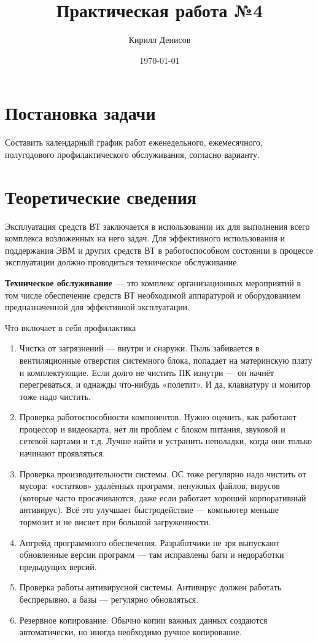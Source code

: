 \documentclass[a4paper,14pt]{extarticle}
\author{Кирилл Денисов}
\title{Практическая работа №4}
\date{\today}
\newcommand{\pathToCommonFolder}{/home/denilai/Documents/repos/latex/Common}
\begin{document}
	\thispagestyle{empty}
	
	\newpage
	\newpage
	
	
	
	
\section*{Постановка задачи}

Составить календарный график работ еженедельного, ежемесячного, полугодового профилактического обслуживания, согласно варианту.

\section*{Теоретические сведения} 

Эксплуатация средств ВТ заключается в использовании их для выполнения всего комплекса возложенных на него задач. Для эффективного использования и поддержания ЭВМ и других средств ВТ в работоспособном состоянии в процессе эксплуатации должно проводиться техническое обслуживание.

\textbf{Техническое обслуживание} --- это комплекс организационных мероприятий в том числе обеспечение средств ВТ необходимой аппаратурой и оборудованием предназначенной для эффективной эксплуатации.

Что включает в себя профилактика
\begin{enumerate}
\item Чистка от загрязнений --- внутри и снаружи. Пыль забивается в вентиляционные отверстия системного блока, попадает на материнскую плату и комплектующие. Если долго не чистить ПК изнутри --- он начнёт перегреваться, и однажды что-нибудь «полетит». И да, клавиатуру и монитор тоже надо чистить.

\item  Проверка работоспособности компонентов. Нужно оценить, как работают процессор и видеокарта, нет ли проблем с блоком питания, звуковой и сетевой картами и т.д. Лучше найти и устранить неполадки, когда они только начинают проявляться.

\item  Проверка производительности системы. ОС тоже регулярно надо чистить от мусора: «остатков» удалённых программ, ненужных файлов, вирусов (которые часто просачиваются, даже если работает хороший корпоративный антивирус). Всё это улучшает быстродействие --- компьютер меньше тормозит и не виснет при большой загруженности.

\item  Апгрейд программного обеспечения. Разработчики не зря выпускают обновленные версии программ --- там исправлены баги и недоработки предыдущих версий.

\item  Проверка работы антивирусной системы. Антивирус должен работать беспрерывно, а базы --- регулярно обновляться.

\item  Резервное копирование. Обычно копии важных данных создаются автоматически, но иногда необходимо ручное копирование.
\end{enumerate}
\end{document}
